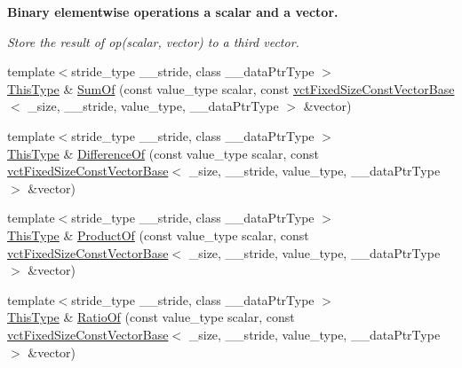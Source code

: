 \begin{Indent}{\bf Binary elementwise operations a scalar and a vector.}\par
{\em Store the result of op(scalar, vector) to a third vector. }\begin{DoxyCompactItemize}
\item 
{\footnotesize template$<$stride\-\_\-type \-\_\-\-\_\-stride, class \-\_\-\-\_\-data\-Ptr\-Type $>$ }\\\hyperlink{classvct_fixed_size_const_vector_base_a071063bc4fa43112cc287b2dbef53180}{This\-Type} \& \hyperlink{classvct_fixed_size_vector_base_a04ba8543a8e7786ccd119a013a3e93e8}{Sum\-Of} (const value\-\_\-type scalar, const \hyperlink{classvct_fixed_size_const_vector_base}{vct\-Fixed\-Size\-Const\-Vector\-Base}$<$ \-\_\-size, \-\_\-\-\_\-stride, value\-\_\-type, \-\_\-\-\_\-data\-Ptr\-Type $>$ \&vector)
\item 
{\footnotesize template$<$stride\-\_\-type \-\_\-\-\_\-stride, class \-\_\-\-\_\-data\-Ptr\-Type $>$ }\\\hyperlink{classvct_fixed_size_const_vector_base_a071063bc4fa43112cc287b2dbef53180}{This\-Type} \& \hyperlink{classvct_fixed_size_vector_base_a0a91cb0cf2913f1b1dc6f986cf058355}{Difference\-Of} (const value\-\_\-type scalar, const \hyperlink{classvct_fixed_size_const_vector_base}{vct\-Fixed\-Size\-Const\-Vector\-Base}$<$ \-\_\-size, \-\_\-\-\_\-stride, value\-\_\-type, \-\_\-\-\_\-data\-Ptr\-Type $>$ \&vector)
\item 
{\footnotesize template$<$stride\-\_\-type \-\_\-\-\_\-stride, class \-\_\-\-\_\-data\-Ptr\-Type $>$ }\\\hyperlink{classvct_fixed_size_const_vector_base_a071063bc4fa43112cc287b2dbef53180}{This\-Type} \& \hyperlink{classvct_fixed_size_vector_base_a91b42e6b52969fadaf6233f87378468e}{Product\-Of} (const value\-\_\-type scalar, const \hyperlink{classvct_fixed_size_const_vector_base}{vct\-Fixed\-Size\-Const\-Vector\-Base}$<$ \-\_\-size, \-\_\-\-\_\-stride, value\-\_\-type, \-\_\-\-\_\-data\-Ptr\-Type $>$ \&vector)
\item 
{\footnotesize template$<$stride\-\_\-type \-\_\-\-\_\-stride, class \-\_\-\-\_\-data\-Ptr\-Type $>$ }\\\hyperlink{classvct_fixed_size_const_vector_base_a071063bc4fa43112cc287b2dbef53180}{This\-Type} \& \hyperlink{classvct_fixed_size_vector_base_a5d06999aca9022a74e1ad6ac9d07b324}{Ratio\-Of} (const value\-\_\-type scalar, const \hyperlink{classvct_fixed_size_const_vector_base}{vct\-Fixed\-Size\-Const\-Vector\-Base}$<$ \-\_\-size, \-\_\-\-\_\-stride, value\-\_\-type, \-\_\-\-\_\-data\-Ptr\-Type $>$ \&vector)

\end{DoxyCompactItemize}
\end{Indent}

